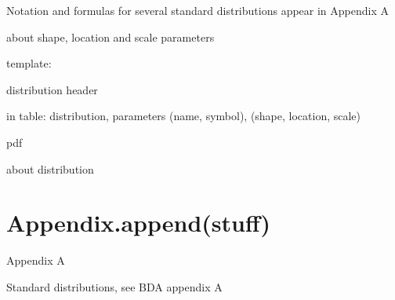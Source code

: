 Notation and formulas for several standard distributions appear in Appendix A 


about shape, location and scale parameters

template: 

distribution header

in table: 
distribution, parameters 
(name, symbol), (shape, location, scale)

pdf

about distribution


\section{Appendix.append(stuff)}

Appendix A

Standard distributions, see BDA appendix A

